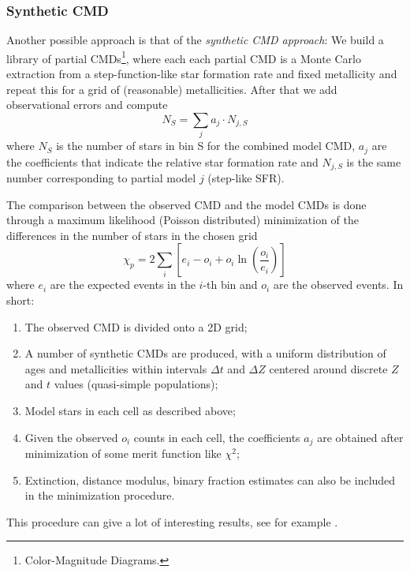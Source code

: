 \subsubsection*{Synthetic CMD}

\par Another possible approach is that of the \emph{synthetic CMD approach}: We build a library of partial CMDs\footnote{Color-Magnitude Diagrams.}, where each each partial CMD is a Monte Carlo extraction from a step-function-like star formation rate and fixed metallicity and repeat this for a grid of (reasonable) metallicities. After that we add observational errors and compute 
\begin{equation*}
    N_{S} = \sum_{j}a_{j}\cdot N_{j,S}
\end{equation*}
where $N_{S}$ is the number of stars in bin S for the combined model CMD, $a_{j}$ are the coefficients that indicate the relative star formation rate and $N_{j,S}$ is the same number corresponding to partial model $j$ (step-like SFR).
\par The comparison between the observed CMD and the model CMDs is done through a maximum likelihood (Poisson distributed) minimization of the differences in the number of stars in the chosen grid
\begin{equation*}
    \chi_{p} = 2\sum_{i}\left[e_{i} - o_{i}+o_{i}\ln\left(\frac{o_{i}}{e_{i}}\right)\right]
\end{equation*}
where $e_{i}$ are the expected events in the $i$-th bin and $o_{i}$ are the observed events. In short:
\begin{enumerate}
    \item The observed CMD is divided onto a 2D grid;
    \item A number of synthetic CMDs are produced, with a uniform distribution of ages and metallicities within intervals $\Delta t$ and $\Delta Z$ centered around discrete $Z$ and $t$ values (quasi-simple populations);
    \item Model stars in each cell as described above;
    \item Given the observed $o_{i}$ counts in each cell, the coefficients $a_{j}$ are obtained after minimization of some merit function like $\chi^{2}$;
    \item Extinction, distance modulus, binary fraction estimates can also be included in the minimization procedure.
\end{enumerate}
\par This procedure can give a lot of interesting results, see for example \cite{dolphin2005}.

